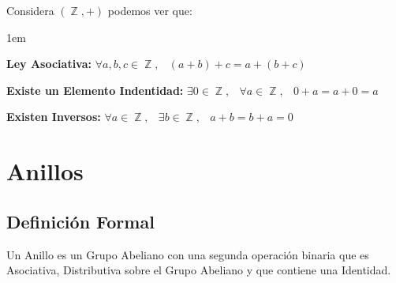 \documentclass[12pt, fleqn]{report}                             %
\newenvironment{Indentation}[1][0.75em]                         %
    {\begin{adjustwidth}{#1}{}}                                     %
    {\end{adjustwidth}}                                             %
\DeclareMathOperator \Space {\quad}                             %
\DeclareMathOperator \MiniSpace {\;}                            %
\DeclareMathOperator \Integers  {\mathbb{Z}}                     %
\begin{document}
                Considera $(\Integers, +)$ podemos ver que:
                \begin{Indentation}[1em]
                \begin{itemize}
                \small{
                    
                    \item 
                        \textbf{Ley Asociativa:}
                        $\forall a, b, c \in \Integers, \MiniSpace (a + b) + c = a + (b + c)$

                    \item 
                        \textbf{Existe un Elemento Indentidad:}
                        $\exists 0 \in \Integers, \MiniSpace
                            \forall a \in \Integers, \MiniSpace 0 + a = a + 0 = a$

                    \item 
                        \textbf{Existen Inversos:}
                        $\forall a \in \Integers, \MiniSpace
                                \exists b \in \Integers, \MiniSpace
                                    a + b = b + a = 0$

                }
                \end{itemize}
                \end{Indentation}







        \clearpage
        \section{Anillos}

            \subsection{Definición Formal}

                Un Anillo es un Grupo Abeliano con una segunda operación binaria que es Asociativa, 
                Distributiva sobre el Grupo Abeliano y que contiene una Identidad.
\end{document}
